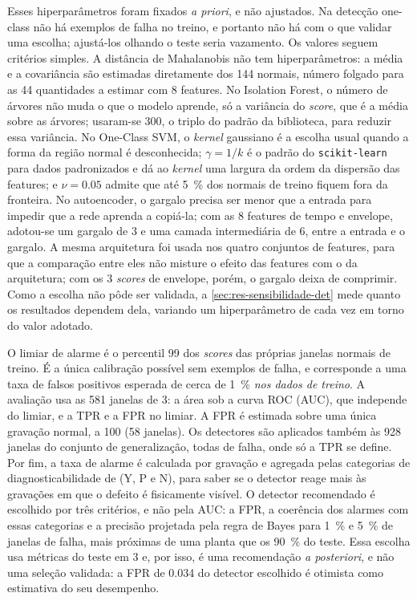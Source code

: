 Esses hiperparâmetros foram fixados \emph{a priori}, e não ajustados. Na
detecção one-class não há exemplos de falha no treino, e portanto não há com o
que validar uma escolha; ajustá-los olhando o teste seria vazamento. Os valores
seguem critérios simples. A distância de Mahalanobis não tem hiperparâmetros: a
média e a covariância são estimadas diretamente dos 144 normais, número folgado
para as 44 quantidades a estimar com 8 features. No Isolation Forest, o número de
árvores não muda o que o modelo aprende, só a variância do \emph{score}, que é a
média sobre as árvores; usaram-se 300, o triplo do padrão da biblioteca, para
reduzir essa variância. No One-Class SVM, o \emph{kernel} gaussiano é a escolha
usual quando a forma da região normal é desconhecida; $\gamma = 1/k$ é o padrão
do \texttt{scikit-learn} para dados padronizados e dá ao \emph{kernel} uma
largura da ordem da dispersão das features; e $\nu = \num{0.05}$ admite que até
\SI{5}{\percent} dos normais de treino fiquem fora da fronteira. No autoencoder,
o gargalo precisa ser menor que a entrada para impedir que a rede aprenda a
copiá-la; com as 8 features de tempo e envelope, adotou-se um gargalo de 3 e uma
camada intermediária de 6, entre a entrada e o gargalo. A mesma arquitetura foi
usada nos quatro conjuntos de features, para que a comparação entre eles não
misture o efeito das features com o da arquitetura; com os 3 \emph{scores} de
envelope, porém, o gargalo deixa de comprimir. Como a escolha não pôde ser
validada, a \autoref{sec:res-sensibilidade-det} mede quanto os resultados
dependem dela, variando um hiperparâmetro de cada vez em torno do valor adotado.

O limiar de alarme é o percentil 99 dos \emph{scores} das próprias janelas normais de
treino. É a única calibração possível sem exemplos de falha, e corresponde a uma
taxa de falsos positivos esperada de cerca de \SI{1}{\percent} \emph{nos dados de
treino}. A avaliação usa as 581 janelas de \SI{3}{\hp}: a área sob a curva ROC
(AUC), que independe do limiar, e a TPR e a FPR no limiar. A FPR é estimada sobre
uma única gravação normal, a 100 (58 janelas). Os detectores são aplicados também
às 928 janelas do conjunto de generalização, todas de falha, onde só a TPR se
define. Por fim, a taxa de alarme é calculada por gravação e agregada pelas
categorias de diagnosticabilidade de \textcite{smith2015} (Y, P e N), para saber
se o detector reage mais às gravações em que o defeito é fisicamente visível.
O detector recomendado é escolhido por três critérios, e não pela AUC: a FPR, a
coerência dos alarmes com essas categorias e a precisão projetada pela regra de
Bayes para \SI{1}{\percent} e \SI{5}{\percent} de janelas de falha, mais
próximas de uma planta que os \SI{90}{\percent} do teste. Essa escolha usa
métricas do teste em \SI{3}{\hp} e, por isso, é uma recomendação
\emph{a posteriori}, e não uma seleção validada: a FPR de \num{0.034} do detector
escolhido é otimista como estimativa do seu desempenho.

